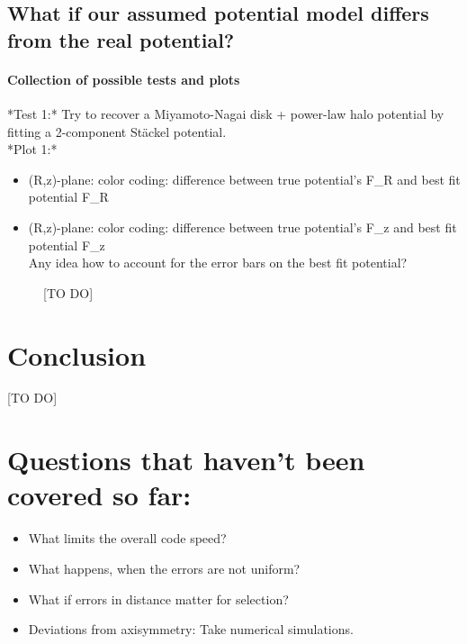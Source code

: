 \documentclass[12pt,preprint]{aastex}
\begin{document}
\subsection{What if our assumed potential model differs from the real potential?}

\paragraph{Collection of possible tests and plots}

*Test 1:* Try to recover a Miyamoto-Nagai disk + power-law halo potential by fitting a 2-component St\"ackel potential. \\
*Plot 1:* 
\begin{itemize}
   \item (R,z)-plane: color coding: difference between true potential's F\_R and best fit potential F\_R
    \item (R,z)-plane: color coding: difference between true potential's F\_z and best fit potential F\_z \\
    Any idea how to account for the error bars on the best fit potential?
\end{itemize}


\begin{figure}
\caption{[TO DO]}
\end{figure}






\section{Conclusion}

[TO DO]

\section{Questions that haven't been covered so far:}

\begin{itemize}
\item What limits the overall code speed?
\item What happens, when the errors are not uniform?
\item What if errors in distance matter for selection?
\item Deviations from axisymmetry: Take numerical simulations.
\end{itemize}
\end{document}
